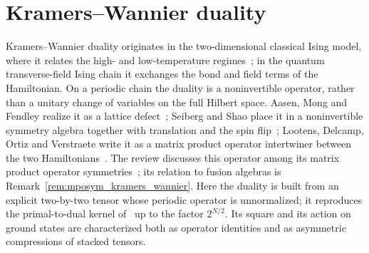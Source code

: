 \section{Kramers--Wannier duality}%
\label{sec:asymex_kw}

Kramers--Wannier duality originates in the two-dimensional classical
Ising model, where it relates the high- and low-temperature
regimes~\cite{KramersWannier1941}; in the quantum transverse-field
Ising chain it exchanges the bond and field terms of the Hamiltonian.
On a periodic chain the duality is a noninvertible operator, rather than
a unitary change of variables on the full Hilbert space. Aasen, Mong and
Fendley realize it as a lattice defect~\cite{Aasen2016Topological};
Seiberg and Shao place it in a noninvertible symmetry algebra together
with translation and the spin flip~\cite{Seiberg2024Majorana}; Lootens,
Delcamp, Ortiz and Verstraete write it as a matrix product operator
intertwiner between the two Hamiltonians~\cite{Lootens2023Dualities}.
The review discusses this operator among its matrix product operator
symmetries~\cite[Section~III.A.6]{Cirac2021Matrix}; its relation to fusion
algebras is Remark~\ref{rem:mposym_kramers_wannier}. Here the duality is
built from an explicit two-by-two tensor whose periodic operator is
unnormalized; it reproduces the primal-to-dual kernel
of~\cite{Aasen2016Topological} up to the factor $2^{N/2}$. Its square
and its action on ground states are characterized both as operator identities
and as asymmetric compressions of stacked tensors.


